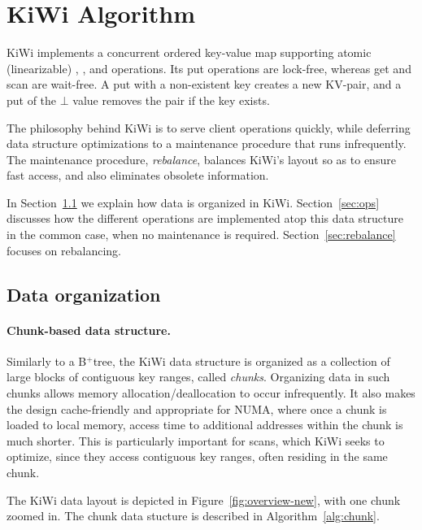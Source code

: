 \section{KiWi Algorithm}
\label{sec:alg}

KiWi implements a concurrent ordered key-value map supporting atomic (linearizable) , , and  operations.
Its put operations are lock-free, whereas get and scan are wait-free. A put with a non-existent key creates a new KV-pair, and a put of the $\bot$ value removes the pair if the key exists.

The philosophy behind KiWi is to serve client operations quickly, while deferring data structure optimizations to a
maintenance procedure that runs infrequently. The maintenance procedure, \emph{rebalance}, balances KiWi's layout so as to ensure fast
access, and also eliminates obsolete information.

In Section~\ref{sec:organization}  we explain how data is organized in KiWi.   Section~\ref{sec:ops} discusses how the different operations are implemented atop this data structure in the common case, 
when no maintenance is required.
Section~\ref{sec:rebalance} focuses on rebalancing.


\subsection{Data organization}
\label{sec:organization}

\paragraph{Chunk-based data structure.}
Similarly to a B$^{+}$tree, the KiWi data structure is organized as a collection of large blocks of contiguous key ranges, called \emph{chunks}. Organizing data in such chunks allows memory allocation/deallocation to occur infrequently. It also makes the design cache-friendly and appropriate for NUMA, where once a chunk is loaded to local memory, access time to additional addresses within the chunk is much shorter. This is particularly important for  scans, which KiWi seeks to optimize, since they access contiguous key ranges, often residing in the same chunk.

The KiWi data layout is depicted in Figure~\ref{fig:overview-new}, with one chunk zoomed in.
The chunk data stucture is described in Algorithm~\ref{alg:chunk}.

